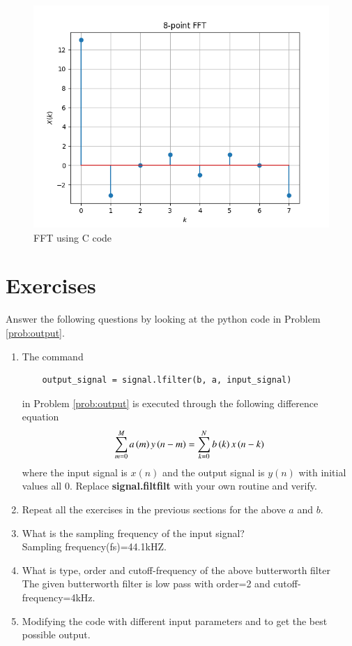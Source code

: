 \documentclass[journal,12pt,twocolumn]{IEEEtran}
\renewcommand\thesection{\arabic{section}}
\begin{document}
\begin{enumerate}[label=\arabic*.,ref=\thesection.\theenumi]
\begin{figure}[!ht]
      \includegraphics[width = \columnwidth]{figs/xk8pointFFT.png}
      \centering
      \caption{FFT using C code}
      \label{DFT_fft}
    \end{figure}
     \end{enumerate}
\section{Exercises}

Answer the following questions by looking at the python code in Problem \ref{prob:output}.
\begin{enumerate}[label=\thesection.\arabic*]
\item
The command
\begin{lstlisting}
	output_signal = signal.lfilter(b, a, input_signal)
	\end{lstlisting}
in Problem \ref{prob:output} is executed through the following difference equation
\begin{equation}
\label{eq:iir_filter_gen}
 \sum _{m=0}^{M}a\left(m\right)y\left(n-m\right)=\sum _{k=0}^{N}b\left(k\right)x\left(n-k\right)
\end{equation}
%
where the input signal is $x(n)$ and the output signal is $y(n)$ with initial values all 0. Replace
\textbf{signal.filtfilt} with your own routine and verify.
%
\item Repeat all the exercises in the previous sections for the above $a$ and $b$.

\item What is the sampling frequency of the input signal?
\\
\solution
Sampling frequency(fs)=44.1kHZ.
\item
What is type, order and  cutoff-frequency of the above butterworth filter
\\
\solution
The given butterworth filter is low pass with order=2 and cutoff-frequency=4kHz.
%
\item
Modifying the code with different input parameters and to get the best possible output.
%
\end{enumerate}
\end{document}
